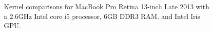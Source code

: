 \begin{figure}[!htb]
\centering
{}


\caption{Kernel comparisons for MacBook Pro Retina 13-inch Late 2013 with a 2.6GHz Intel core i5 processor, 6GB DDR3 RAM, and Intel Iris GPU.
\label{fig:perf-macbook-kernels}}
\end{figure}

